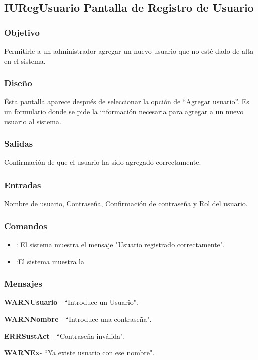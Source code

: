 \subsection{IURegUsuario Pantalla de Registro de Usuario}

\subsubsection{Objetivo}
	Permitirle a un administrador agregar un nuevo usuario que no esté dado de alta en el sistema.

\subsubsection{Diseño}
	\'Esta pantalla aparece despu\'es de seleccionar la opción de "`Agregar usuario"'. Es un formulario donde se pide la informaci\'on necesaria para agregar a un nuevo usuario al sistema.


\subsubsection{Salidas}

	Confirmación de que el usuario ha sido agregado correctamente.

\subsubsection{Entradas}
	Nombre de usuario, Contraseña, Confirmación de contraseña y Rol del usuario.

\subsubsection{Comandos}
\begin{itemize}
		\item {} : El sistema muestra el mensaje "Usuario registrado correctamente".
		\item {} :El sistema muestra la \label{IUAdmin}
\end{itemize}

\subsubsection{Mensajes}
	\begin{Citemize}
		\item {\bf WARNUsuario} - ``Introduce un Usuario".
		\item {\bf WARNNombre} - ``Introduce una contraseña".
		\item {\bf ERRSustAct} - ``Contraseña inválida".
		\item {\bf WARNEx}- ``Ya existe usuario con ese nombre".
	\end{Citemize}